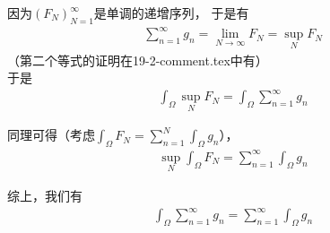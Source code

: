 \documentclass{article}
\begin{document}
因为$(F_N)_{N = 1}^\infty$是单调的递增序列，
于是有
\begin{align*}
  \sum \limits_{n = 1}^\infty g_n = \lim\limits_{N \to \infty} F_N = \sup\limits_{N} F_N
\end{align*}
（第二个等式的证明在19-2-comment.tex中有）\\
于是
\begin{align*}
  \int_{\Omega} \sup\limits_{N} F_N  = \int_{\Omega} \sum \limits_{n = 1}^\infty g_n 
\end{align*}

同理可得（考虑$\int_{\Omega} F_N = \sum \limits_{n = 1}^N \int_{\Omega} g_n $），
\begin{align*}
  \sup\limits_{N} \int_{\Omega} F_N = \sum \limits_{n = 1}^\infty \int_{\Omega} g_n 
\end{align*}

综上，我们有
\begin{align*}
  \int_{\Omega} \sum \limits_{n = 1}^\infty g_n = \sum \limits_{n = 1}^\infty \int_{\Omega} g_n
\end{align*}
\end{document}
